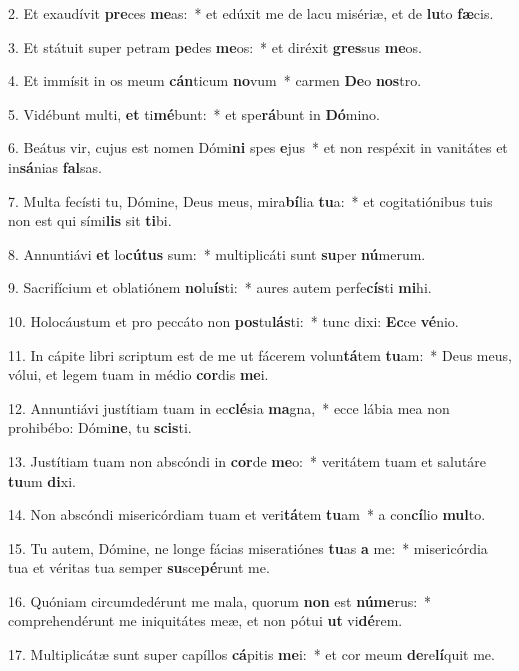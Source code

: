 2. Et exaudívit \textbf{pre}ces \textbf{me}as:~*  et edúxit me de lacu misériæ, et de \textbf{lu}to \textbf{fæ}cis.\

3. Et státuit super petram \textbf{pe}des \textbf{me}os:~*  et diréxit \textbf{gres}sus \textbf{me}os.\

4. Et immísit in os meum \textbf{cán}ticum \textbf{no}vum~*  carmen \textbf{De}o \textbf{nos}tro.\

5. Vidébunt multi, \textbf{et} ti\textbf{mé}bunt:~*  et spe\textbf{rá}bunt in \textbf{Dó}mino.\

6. Beátus vir, cujus est nomen Dómi\textbf{ni} spes \textbf{e}jus~*  et non respéxit in vanitátes et in\textbf{sá}nias \textbf{fal}sas.\

7. Multa fecísti tu, Dómine, Deus meus, mira\textbf{bí}lia \textbf{tu}a:~*  et cogitatiónibus tuis non est qui sími\textbf{lis} sit \textbf{ti}bi.\

8. Annuntiávi \textbf{et} lo\textbf{cú}\textbf{tus} sum:~*  multiplicáti sunt \textbf{su}per \textbf{nú}merum.\

9. Sacrifícium et oblatiónem \textbf{no}lu\textbf{ís}ti:~*  aures autem perfe\textbf{cís}ti \textbf{mi}hi.\

10. Holocáustum et pro peccáto non \textbf{pos}tu\textbf{lás}ti:~*  tunc dixi: \textbf{Ec}ce \textbf{vé}nio.\

11. In cápite libri scriptum est de me ut fácerem volun\textbf{tá}tem \textbf{tu}am:~*  Deus meus, vólui, et legem tuam in médio \textbf{cor}dis \textbf{me}i.\

12. Annuntiávi justítiam tuam in ec\textbf{clé}sia \textbf{ma}gna,~*  ecce lábia mea non prohibébo: Dómi\textbf{ne}, tu \textbf{scis}ti.\

13. Justítiam tuam non abscóndi in \textbf{cor}de \textbf{me}o:~*  veritátem tuam et salutáre \textbf{tu}um \textbf{di}xi.\

14. Non abscóndi misericórdiam tuam et veri\textbf{tá}tem \textbf{tu}am~*  a con\textbf{cí}lio \textbf{mul}to.\

15. Tu autem, Dómine, ne longe fácias miseratiónes \textbf{tu}as \textbf{a} me:~*  misericórdia tua et véritas tua semper \textbf{su}sce\textbf{pé}runt me.\

16. Quóniam circumdedérunt me mala, quorum \textbf{non} est \textbf{nú}\textbf{me}rus:~*  comprehendérunt me iniquitátes meæ, et non pótui \textbf{ut} vi\textbf{dé}rem.\

17. Multiplicátæ sunt super capíllos \textbf{cá}pitis \textbf{me}i:~*  et cor meum \textbf{de}re\textbf{lí}quit me.\

